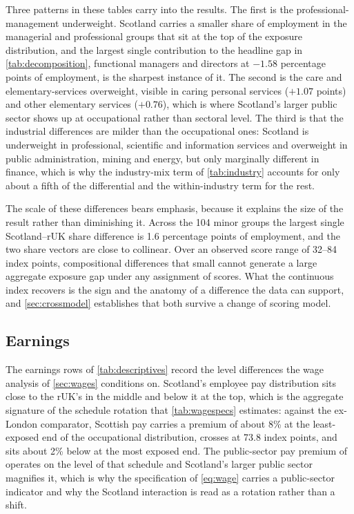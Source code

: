 Three patterns in these tables carry into the results. The first is the professional-management underweight. Scotland carries a smaller share of employment in the managerial and professional groups that sit at the top of the exposure distribution, and the largest single contribution to the headline gap in \cref{tab:decomposition}, functional managers and directors at $-1.58$ percentage points of employment, is the sharpest instance of it. The second is the care and elementary-services overweight, visible in caring personal services ($+1.07$ points) and other elementary services ($+0.76$), which is where Scotland's larger public sector shows up at occupational rather than sectoral level. The third is that the industrial differences are milder than the occupational ones: Scotland is underweight in professional, scientific and information services and overweight in public administration, mining and energy, but only marginally different in finance, which is why the industry-mix term of \cref{tab:industry} accounts for only about a fifth of the differential and the within-industry term for the rest.

The scale of these differences bears emphasis, because it explains the size of the result rather than diminishing it. Across the 104 minor groups the largest single Scotland--rUK share difference is 1.6 percentage points of employment, and the two share vectors are close to collinear. Over an observed score range of 32--84 index points, compositional differences that small cannot generate a large aggregate exposure gap under any assignment of scores. What the continuous index recovers is the sign and the anatomy of a difference the data can support, and \cref{sec:crossmodel} establishes that both survive a change of scoring model.

\subsection{Earnings}

The earnings rows of \cref{tab:descriptives} record the level differences the wage analysis of \cref{sec:wages} conditions on. Scotland's employee pay distribution sits close to the rUK's in the middle and below it at the top, which is the aggregate signature of the schedule rotation that \cref{tab:wagespecs} estimates: against the ex-London comparator, Scottish pay carries a premium of about 8\% at the least-exposed end of the occupational distribution, crosses at 73.8 index points, and sits about 2\% below at the most exposed end. The public-sector pay premium of \citet{cribb2025} operates on the level of that schedule and Scotland's larger public sector magnifies it, which is why the specification of \cref{eq:wage} carries a public-sector indicator and why the Scotland interaction is read as a rotation rather than a shift.